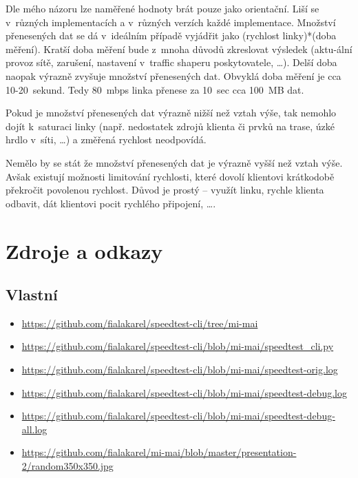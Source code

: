 \documentclass[12pt,a4paper]{article}
\begin{document}
\medskip

Dle mého názoru lze naměřené hodnoty brát pouze jako orientační. Liší se v~různých implementacích a v~různých verzích každé implementace. Množství přenesených dat se dá v~ideálním případě vyjádřit jako (rychlost linky)*(doba měření). Kratší doba měření bude z~mnoha důvodů zkreslovat výsledek (aktu-ální provoz sítě, zarušení,  nastavení v~traffic shaperu poskytovatele, \ldots). Delší doba naopak výrazně zvyšuje množství přenesených dat. Obvyklá doba měření je cca 10-20~sekund. Tedy 80~mbps linka přenese za 10~sec cca 100~MB dat.

\medskip

Pokud je množství přenesených dat výrazně nižší než vztah výše, tak nemohlo dojít k~saturaci linky (např. nedostatek zdrojů klienta či prvků na trase, úzké hrdlo v~síti, \ldots) a změřená rychlost neodpovídá.  

\medskip

Nemělo by se stát že množství přenesených dat je výrazně vyšší než vztah výše. Avšak existují možnosti limitování rychlosti, které dovolí klientovi krátkodobě překročit povolenou rychlost. Důvod je prostý -- využít linku, rychle klienta odbavit, dát klientovi pocit rychlého připojení, \ldots.  

\pagebreak

\section{Zdroje a odkazy}

\subsection{Vlastní}

\begin{itemize}
\item \href{https://github.com/fialakarel/speedtest-cli/tree/mi-mai}
	    {https://github.com/fialakarel/speedtest-cli/tree/mi-mai}
\item \href{https://github.com/fialakarel/speedtest-cli/blob/mi-mai/speedtest\_cli.py}
	    {https://github.com/fialakarel/speedtest-cli/blob/mi-mai/speedtest\_cli.py}
\item \href{https://github.com/fialakarel/speedtest-cli/blob/mi-mai/speedtest-orig.log}
	    {https://github.com/fialakarel/speedtest-cli/blob/mi-mai/speedtest-orig.log}
\item \href{https://github.com/fialakarel/speedtest-cli/blob/mi-mai/speedtest-debug.log}
	    {https://github.com/fialakarel/speedtest-cli/blob/mi-mai/speedtest-debug.log}
\item \href{https://github.com/fialakarel/speedtest-cli/blob/mi-mai/speedtest-debug-all.log}
	    {https://github.com/fialakarel/speedtest-cli/blob/mi-mai/speedtest-debug-all.log}
\item \href{https://github.com/fialakarel/mi-mai/blob/master/presentation-2/random350x350.jpg}
	    {https://github.com/fialakarel/mi-mai/blob/master/presentation-2/random350x350.jpg}
\end{itemize}
\end{document}
